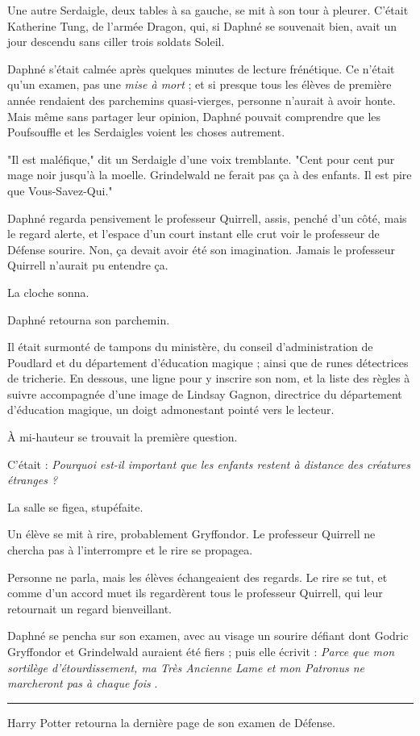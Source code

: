 Une autre Serdaigle, deux tables à sa gauche, se mit à son tour à pleurer. C'était Katherine Tung, de l'armée Dragon, qui, si Daphné se souvenait bien, avait un jour descendu sans ciller trois soldats Soleil.

Daphné s'était calmée après quelques minutes de lecture frénétique. Ce n'était qu'un examen, pas une \emph{mise à mort}  ; et si presque tous les élèves de première année rendaient des parchemins quasi-vierges, personne n'aurait à avoir honte. Mais même sans partager leur opinion, Daphné pouvait comprendre que les Poufsouffle et les Serdaigles voient les choses autrement.

"Il est maléfique," dit un Serdaigle d'une voix tremblante. "Cent pour cent pur mage noir jusqu'à la moelle. Grindelwald ne ferait pas ça à des enfants. Il est pire que Vous-Savez-Qui."

Daphné regarda pensivement le professeur Quirrell, assis, penché d'un côté, mais le regard alerte, et l'espace d'un court instant elle crut voir le professeur de Défense sourire. Non, ça devait avoir été son imagination. Jamais le professeur Quirrell n'aurait pu entendre ça.

La cloche sonna.

Daphné retourna son parchemin.

Il était surmonté de tampons du ministère, du conseil d'administration de Poudlard et du département d'éducation magique ; ainsi que de runes détectrices de tricherie. En dessous, une ligne pour y inscrire son nom, et la liste des règles à suivre accompagnée d'une image de Lindsay Gagnon, directrice du département d'éducation magique, un doigt admonestant pointé vers le lecteur.

À mi-hauteur se trouvait la première question.

C'était : \emph{Pourquoi est-il important que les enfants restent à distance des créatures étranges ?} 

La salle se figea, stupéfaite.

Un élève se mit à rire, probablement Gryffondor. Le professeur Quirrell ne chercha pas à l'interrompre et le rire se propagea.

Personne ne parla, mais les élèves échangeaient des regards. Le rire se tut, et comme d'un accord muet ils regardèrent tous le professeur Quirrell, qui leur retournait un regard bienveillant.

Daphné se pencha sur son examen, avec au visage un sourire défiant dont Godric Gryffondor et Grindelwald auraient été fiers ; puis elle écrivit : \emph{Parce que mon sortilège d'étourdissement, ma Très Ancienne Lame et mon Patronus ne marcheront pas à chaque fois} .
\par\noindent\rule{\textwidth}{0.4pt}
Harry Potter retourna la dernière page de son examen de Défense.

